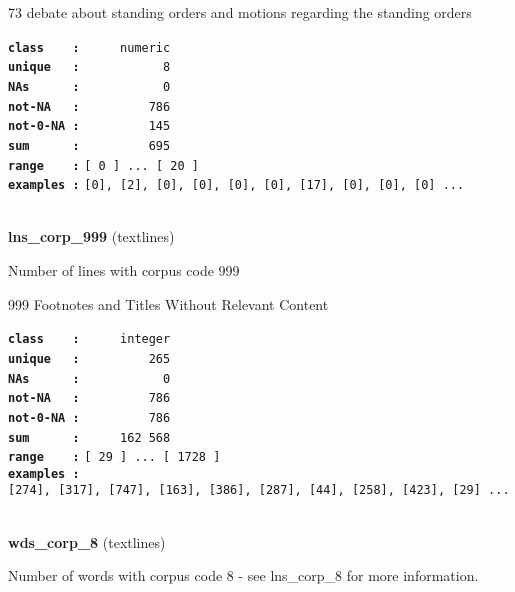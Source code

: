 \documentclass[]{article}
\begin{document}
73 debate about standing orders and motions regarding the standing
orders

\textbf{\texttt{class\ \ \ \ :}} \texttt{~~~~~numeric}\\
\textbf{\texttt{unique\ \ \ :}} \texttt{~~~~~~~~~~~8}\\
\textbf{\texttt{NAs\ \ \ \ \ \ :}} \texttt{~~~~~~~~~~~0}\\
\textbf{\texttt{not-NA\ \ \ :}} \texttt{~~~~~~~~~786}\\
\textbf{\texttt{not-0-NA\ :}} \texttt{~~~~~~~~~145}\\
\textbf{\texttt{sum\ \ \ \ \ \ :}} \texttt{~~~~~~~~~695}\\
\textbf{\texttt{range\ \ \ \ :}}
\texttt{{[}\ 0\ {]}\ ...\ {[}\ 20\ {]}}\\
\textbf{\texttt{examples\ :}}
\texttt{{[}0{]},\ {[}2{]},\ {[}0{]},\ {[}0{]},\ {[}0{]},\ {[}0{]},\ {[}17{]},\ {[}0{]},\ {[}0{]},\ {[}0{]}\ ...}\\

~

\textbf{lns\_corp\_999} (textlines)

Number of lines with corpus code 999

999 Footnotes and Titles Without Relevant Content

\textbf{\texttt{class\ \ \ \ :}} \texttt{~~~~~integer}\\
\textbf{\texttt{unique\ \ \ :}} \texttt{~~~~~~~~~265}\\
\textbf{\texttt{NAs\ \ \ \ \ \ :}} \texttt{~~~~~~~~~~~0}\\
\textbf{\texttt{not-NA\ \ \ :}} \texttt{~~~~~~~~~786}\\
\textbf{\texttt{not-0-NA\ :}} \texttt{~~~~~~~~~786}\\
\textbf{\texttt{sum\ \ \ \ \ \ :}} \texttt{~~~~~162~568}\\
\textbf{\texttt{range\ \ \ \ :}}
\texttt{{[}\ 29\ {]}\ ...\ {[}\ 1728\ {]}}\\
\textbf{\texttt{examples\ :}}
\texttt{{[}274{]},\ {[}317{]},\ {[}747{]},\ {[}163{]},\ {[}386{]},\ {[}287{]},\ {[}44{]},\ {[}258{]},\ {[}423{]},\ {[}29{]}\ ...}\\

~

\textbf{wds\_corp\_8} (textlines)

Number of words with corpus code 8 - see lns\_corp\_8 for more
information.
\end{document}

